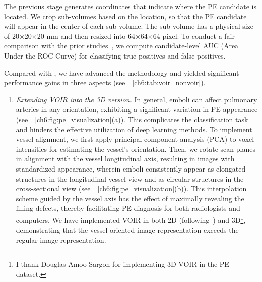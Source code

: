 The previous stage generates coordinates that indicate where the PE candidate is located. We crop sub-volumes based on the location, so that the PE candidate will appear in the center of each sub-volume. The sub-volume has a physical size of 20$\times$20$\times$20 mm and then resized into 64$\times$64$\times$64 pixel. To conduct a fair comparison with the prior studies~\citep{zhou2017fine,tajbakhsh2016convolutional,tajbakhsh2019computer}, we compute candidate-level AUC (Area Under the ROC Curve) for classifying true positives and false positives. 


Compared with \citet{tajbakhsh2019computer}, we have advanced the methodology and yielded significant performance gains in three aspects (see~\tableautorefname~\ref{ch6:tab:voir_nonvoir}).

\begin{enumerate}

    \item \textit{Extending VOIR into the 3D version.} 
    In general, emboli can affect pulmonary arteries in any orientation, exhibiting a significant variation in PE appearance (see~\figureautorefname~\ref{ch6:fig:pe_visualization}(a)). This complicates the classification task and hinders the effective utilization of deep learning methods. To implement vessel alignment, we first apply principal component analysis (PCA) to voxel intensities for estimating the vessel's orientation. Then, we rotate scan planes in alignment with the vessel longitudinal axis, resulting in images with standardized appearance, wherein emboli consistently appear as elongated structures in the longitudinal vessel view and as circular structures in the cross-sectional view (see~\figureautorefname~\ref{ch6:fig:pe_visualization}(b)). This interpolation scheme guided by the vessel axis has the effect of maximally revealing the filling defects, thereby facilitating PE diagnosis for both radiologists and computers. We have implemented VOIR in both 2D (following~\citet{tajbakhsh2019computer}) and 3D\footnote{I thank Douglas Amoo-Sargon for implementing 3D VOIR in the PE dataset.}, demonstrating that the vessel-oriented image representation exceeds the regular image representation.
    

\end{enumerate}
